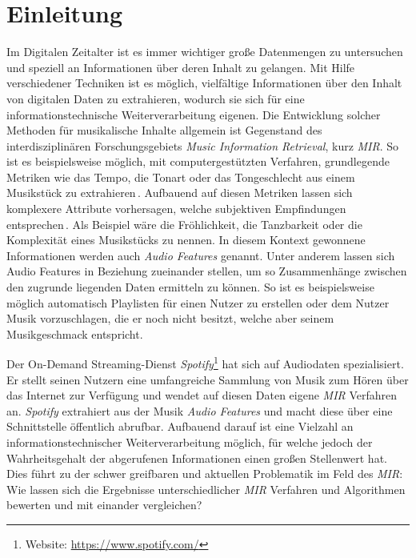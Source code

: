 \section*{Einleitung}
\label{sec:Einleitung}

Im Digitalen Zeitalter ist es immer wichtiger große Datenmengen zu untersuchen und speziell an Informationen über deren Inhalt zu gelangen.
Mit Hilfe verschiedener Techniken ist es möglich, vielfältige Informationen über den Inhalt von digitalen Daten zu extrahieren, wodurch sie sich für eine informationstechnische Weiterverarbeitung eigenen.
Die Entwicklung solcher Methoden für musikalische Inhalte allgemein ist Gegenstand des interdisziplinären Forschungsgebiets \textit{Music Information Retrieval}, kurz \textit{MIR}.
So ist es beispielsweise möglich, mit computergestützten Verfahren, grundlegende Metriken wie das Tempo, die Tonart oder das Tongeschlecht aus einem Musikstück zu extrahieren\,\cite{Casey2008}.
Aufbauend auf diesen Metriken lassen sich komplexere Attribute vorhersagen, welche subjektiven Empfindungen entsprechen\,\cite{Sturm2013}.
Als Beispiel wäre die Fröhlichkeit, die Tanzbarkeit oder die Komplexität eines Musikstücks zu nennen.
In diesem Kontext gewonnene Informationen werden auch \textit{Audio Features} genannt.
Unter anderem lassen sich Audio Features in Beziehung zueinander stellen, um so Zusammenhänge zwischen den zugrunde liegenden Daten ermitteln zu können.
So ist es beispielsweise möglich automatisch Playlisten für einen Nutzer zu erstellen oder dem Nutzer Musik vorzuschlagen, die er noch nicht besitzt, welche aber seinem Musikgeschmack entspricht.

Der On-Demand Streaming-Dienst \textit{Spotify}\footnote{Website: \url{https://www.spotify.com/}} hat sich auf Audiodaten spezialisiert.
Er stellt seinen Nutzern eine umfangreiche Sammlung von Musik zum Hören über das Internet zur Verfügung und wendet auf diesen Daten eigene \textit{MIR} Verfahren an.
\textit{Spotify} extrahiert aus der Musik \textit{Audio Features} und macht diese über eine Schnittstelle öffentlich abrufbar.
Aufbauend darauf ist eine Vielzahl an informationstechnischer Weiterverarbeitung möglich, für welche jedoch der Wahrheitsgehalt der abgerufenen Informationen einen großen Stellenwert hat.
Dies führt zu der schwer greifbaren und aktuellen Problematik im Feld des \textit{MIR}:
Wie lassen sich die Ergebnisse unterschiedlicher \textit{MIR} Verfahren und Algorithmen bewerten und mit einander vergleichen? \cite{Downie2004}

